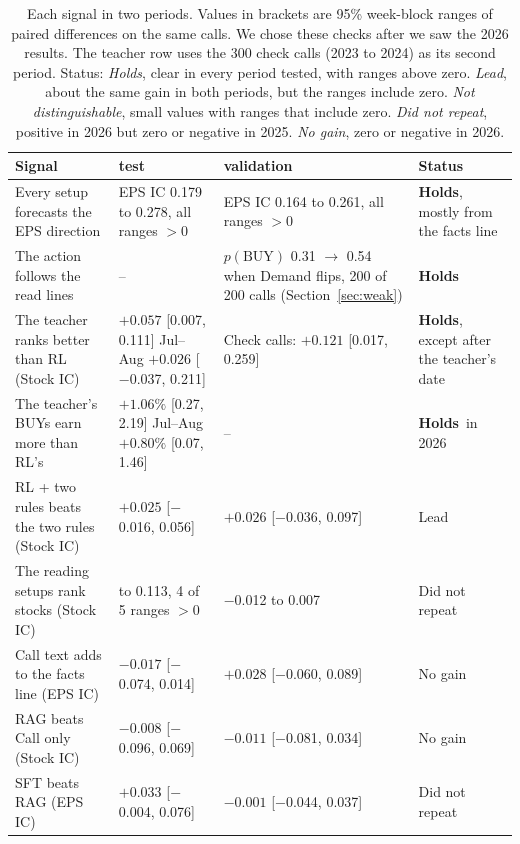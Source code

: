 \documentclass[sigconf,nonacm]{acmart}
\newcommand{\rng}[2]{{\scriptsize[#1, #2]}}
\newcommand{\hold}{\textbf{Holds}}
\begin{document}
\begin{table}[t]
\caption{Each signal in two periods. Values in brackets are 95\% week-block ranges of paired differences on the same calls. We chose these checks after we saw the 2026 results. The teacher row uses the 300 check calls (2023 to 2024) as its second period. Status: \emph{Holds}, clear in every period tested, with ranges above zero. \emph{Lead}, about the same gain in both periods, but the ranges include zero. \emph{Not distinguishable}, small values with ranges that include zero. \emph{Did not repeat}, positive in 2026 but zero or negative in 2025. \emph{No gain}, zero or negative in 2026.}
\label{tab:signals}
\footnotesize
\begin{tabularx}{\textwidth}{>{\raggedright\arraybackslash}p{4.4cm} >{\raggedright\arraybackslash}X >{\raggedright\arraybackslash}X >{\raggedright\arraybackslash}p{2.9cm}}
\toprule
Signal & 2026 test & 2025 validation & Status \\
\midrule
Every setup forecasts the EPS direction & EPS IC 0.179 to 0.278, all ranges $>0$ & EPS IC 0.164 to 0.261, all ranges $>0$ & \hold, mostly from the facts line \\
The action follows the read lines & -- & $p(\text{BUY})$ 0.31 $\to$ 0.54 when Demand flips, 200 of 200 calls (Section~\ref{sec:weak}) & \hold \\
The teacher ranks better than RL (Stock IC) & $+0.057$ \rng{0.007}{0.111} \newline Jul--Aug $+0.026$ \rng{$-$0.037}{0.211} & Check calls: $+0.121$ \rng{0.017}{0.259} & \hold, except after the teacher's date \\
The teacher's BUYs earn more than RL's & $+1.06\%$ \rng{0.27}{2.19} \newline Jul--Aug $+0.80\%$ \rng{0.07}{1.46} & -- & \hold \ in 2026 \\
\midrule
RL + two rules beats the two rules (Stock IC) & $+0.025$ \rng{$-$0.016}{0.056} & $+0.026$ \rng{$-$0.036}{0.097} & Lead \\
\midrule
The reading setups rank stocks (Stock IC) & 0.096 to 0.113, 4 of 5 ranges $>0$ & $-$0.012 to 0.007 & Did not repeat \\
Call text adds to the facts line (EPS IC) & $-0.017$ \rng{$-$0.074}{0.014} & $+0.028$ \rng{$-$0.060}{0.089} & No gain \\
RAG beats Call only (Stock IC) & $-0.008$ \rng{$-$0.096}{0.069} & $-0.011$ \rng{$-$0.081}{0.034} & No gain \\
SFT beats RAG (EPS IC) & $+0.033$ \rng{$-$0.004}{0.076} & $-0.001$ \rng{$-$0.044}{0.037} & Did not repeat \\

\end{tabularx}
\end{table}
\end{document}

